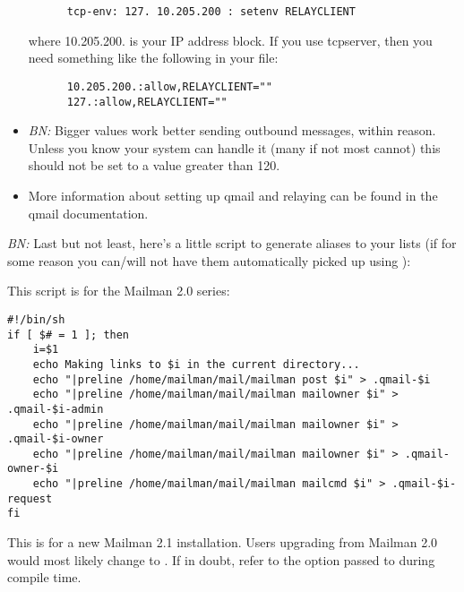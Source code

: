 \documentclass{howto}
\begin{document}
\begin{itemize}
\begin{verbatim}
      tcp-env: 127. 10.205.200 : setenv RELAYCLIENT
\end{verbatim}

      where 10.205.200. is your IP address block.  If you use tcpserver, then
      you need something like the following in your  file:

\begin{verbatim}
      10.205.200.:allow,RELAYCLIENT=""
      127.:allow,RELAYCLIENT=""
\end{verbatim}

\item \emph{BN:} Bigger  values
      work better sending outbound messages, within reason.  Unless you know
      your system can handle it (many if not most cannot) this should not be
      set to a value greater than 120.

\item More information about setting up qmail and relaying can be found in the
      qmail documentation.
\end{itemize}

\emph{BN:} Last but not least, here's a little script to generate aliases to
your lists (if for some reason you can/will not have them automatically picked
up using ):

This script is for the Mailman 2.0 series:

\begin{verbatim}
#!/bin/sh
if [ $# = 1 ]; then
    i=$1
    echo Making links to $i in the current directory...
    echo "|preline /home/mailman/mail/mailman post $i" > .qmail-$i
    echo "|preline /home/mailman/mail/mailman mailowner $i" > .qmail-$i-admin
    echo "|preline /home/mailman/mail/mailman mailowner $i" > .qmail-$i-owner
    echo "|preline /home/mailman/mail/mailman mailowner $i" > .qmail-owner-$i
    echo "|preline /home/mailman/mail/mailman mailcmd $i" > .qmail-$i-request
fi
\end{verbatim}

\begin{notice}[note]
This is for a new Mailman 2.1 installation.  Users upgrading from
Mailman 2.0 would most likely change  to
.  If in doubt, refer to the 
option passed to  during compile time.
\end{notice}
\end{document}
